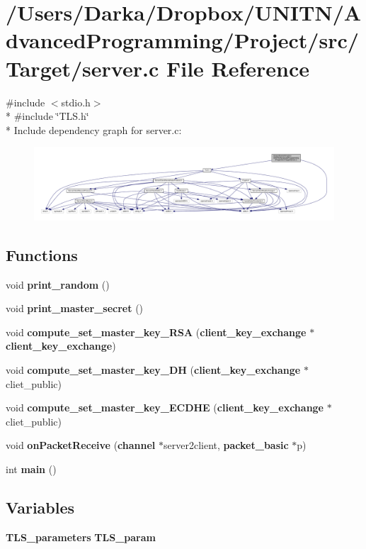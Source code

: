 \section{/\+Users/\+Darka/\+Dropbox/\+U\+N\+I\+T\+N/\+Advanced\+Programming/\+Project/src/\+Target/server.c File Reference}
\label{server_8c}
{\ttfamily \#include $<$stdio.\+h$>$}\\*
{\ttfamily \#include \char`\"{}T\+L\+S.\+h\char`\"{}}\\*
Include dependency graph for server.\+c\+:\nopagebreak
\begin{figure}[H]
\begin{center}
\leavevmode
\includegraphics[width=350pt]{server_8c__incl}
\end{center}
\end{figure}
\subsection*{Functions}
\begin{DoxyCompactItemize}
\item 
void {\bf print\+\_\+random} ()
\item 
void {\bf print\+\_\+master\+\_\+secret} ()
\item 
void {\bf compute\+\_\+set\+\_\+master\+\_\+key\+\_\+\+R\+SA} ({\bf client\+\_\+key\+\_\+exchange} $\ast${\bf client\+\_\+key\+\_\+exchange})
\item 
void {\bf compute\+\_\+set\+\_\+master\+\_\+key\+\_\+\+DH} ({\bf client\+\_\+key\+\_\+exchange} $\ast$cliet\+\_\+public)
\item 
void {\bf compute\+\_\+set\+\_\+master\+\_\+key\+\_\+\+E\+C\+D\+HE} ({\bf client\+\_\+key\+\_\+exchange} $\ast$cliet\+\_\+public)
\item 
void {\bf on\+Packet\+Receive} ({\bf channel} $\ast$server2client, {\bf packet\+\_\+basic} $\ast$p)
\item 
int {\bf main} ()
\end{DoxyCompactItemize}
\subsection*{Variables}
\begin{DoxyCompactItemize}
\item 
{\bf T\+L\+S\+\_\+parameters} {\bf T\+L\+S\+\_\+param}
\end{DoxyCompactItemize}


